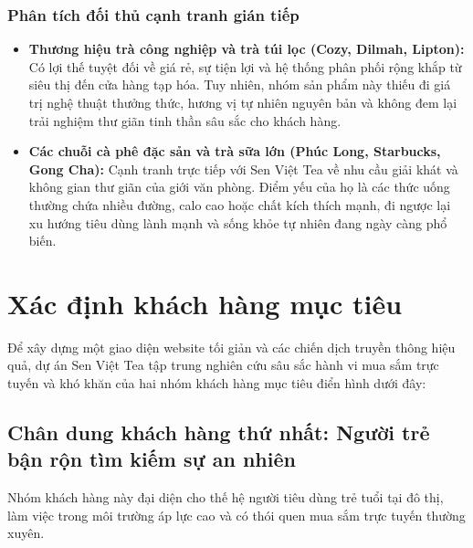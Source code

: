 \subsubsection{Phân tích đối thủ cạnh tranh gián tiếp}
\begin{itemize}
    \item \textbf{Thương hiệu trà công nghiệp và trà túi lọc (Cozy, Dilmah, Lipton):} Có lợi thế tuyệt đối về giá rẻ, sự tiện lợi và hệ thống phân phối rộng khắp từ siêu thị đến cửa hàng tạp hóa. Tuy nhiên, nhóm sản phẩm này thiếu đi giá trị nghệ thuật thưởng thức, hương vị tự nhiên nguyên bản và không đem lại trải nghiệm thư giãn tinh thần sâu sắc cho khách hàng.
    \item \textbf{Các chuỗi cà phê đặc sản và trà sữa lớn (Phúc Long, Starbucks, Gong Cha):} Cạnh tranh trực tiếp với Sen Việt Tea về nhu cầu giải khát và không gian thư giãn của giới văn phòng. Điểm yếu của họ là các thức uống thường chứa nhiều đường, calo cao hoặc chất kích thích mạnh, đi ngược lại xu hướng tiêu dùng lành mạnh và sống khỏe tự nhiên đang ngày càng phổ biến.
\end{itemize}



\section{Xác định khách hàng mục tiêu}

Để xây dựng một giao diện website tối giản và các chiến dịch truyền thông hiệu quả, dự án Sen Việt Tea tập trung nghiên cứu sâu sắc hành vi mua sắm trực tuyến và khó khăn của hai nhóm khách hàng mục tiêu điển hình dưới đây:

\subsection{Chân dung khách hàng thứ nhất: Người trẻ bận rộn tìm kiếm sự an nhiên}
Nhóm khách hàng này đại diện cho thế hệ người tiêu dùng trẻ tuổi tại đô thị, làm việc trong môi trường áp lực cao và có thói quen mua sắm trực tuyến thường xuyên.

